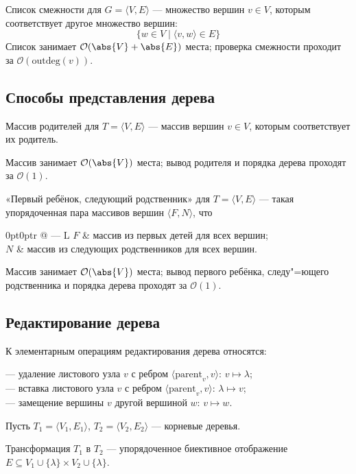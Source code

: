 {\ital Список смежности} для $G=\langle V,E\rangle$ --- множество вершин $v\in V$, которым соответствует другое множество вершин:
$$\{w\in V\mid\langle v,w\rangle\in E\}$$
Список занимает $\mathcal{O}(\abs{V}+\abs{E})$ места; проверка смежности проходит за $\mathcal{O}(\text{outdeg}(v))$.

\subsection{Способы представления дерева}

{\ital Массив родителей} для $T=\langle V,E\rangle$ --- массив вершин $v\in V$, которым соответствует их родитель.

Массив занимает $\mathcal{O}(\abs{V})$ места; вывод родителя и порядка дерева проходят за $\mathcal{O}(1)$.

{\ital «Первый ребёнок, следующий родственник»} для $T=\langle V,E\rangle$ --- такая упорядоченная пара массивов вершин $\langle F,N\rangle$, что

\begin{tabularcx}{0pt}{0pt}{r @{ --- } L}{\textwidth}
$F$ & массив из первых детей для всех вершин;\\
$N$ & массив из следующих родственников для всех вершин.
\end{tabularcx}

Массив занимает $\mathcal{O}(\abs{V})$ места; вывод первого ребёнка, следу"=ющего родственника и порядка дерева проходят за $\mathcal{O}(1)$.

\subsection{Редактирование дерева}

К {\bold элементарным операциям} редактирования дерева относятся:

--- {\ital удаление} листового узла $v$ с ребром $\langle\text{parent}_v,v\rangle$: $v\mapsto\lambda$;\\
--- {\ital вставка} листового узла $v$ с ребром $\langle\text{parent}_v,v\rangle$: $\lambda\mapsto v$;\\
--- {\ital замещение} вершины $v$ другой вершиной $w$: $v\mapsto w$.

Пусть $T_1=\langle V_1,E_1\rangle$, $T_2=\langle V_2,E_2\rangle$ --- корневые деревья.

{\ital Трансформация} $T_1$ в $T_2$ --- упорядоченное биективное отображение $E\subseteq V_1\cup\{\lambda\}\times V_2\cup\{\lambda\}$.

